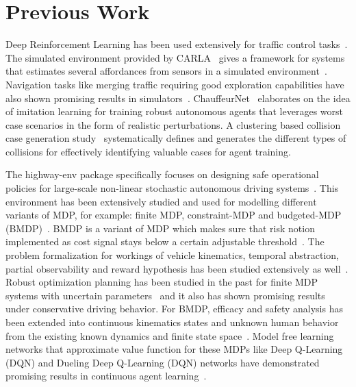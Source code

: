 \documentclass[a4, conference]{IEEEtran}
\begin{document}
\section{Previous Work}


    Deep Reinforcement Learning has been used extensively for traffic control tasks~\cite{belletti2017expert, wu2017emergent}. The simulated environment provided by CARLA~\cite{dosovitskiy2017carla} gives a framework for systems that estimates several affordances from sensors in a simulated environment~\cite{sauer2018conditional}. Navigation tasks like merging traffic requiring good exploration capabilities have also shown promising results in simulators~\cite{shalev2016safe}. ChauffeurNet~\cite{bansal2018chauffeurnet} elaborates on the idea of imitation learning for training robust autonomous agents that leverages worst case scenarios in the form of realistic perturbations. A clustering based collision case generation study~\cite{sun2021corner} systematically defines and generates the different types of collisions for effectively identifying valuable cases for agent training.

    The highway-env package specifically focuses on designing safe operational policies for large-scale non-linear stochastic autonomous driving systems~\cite{leurent2019approximate}. This environment has been extensively studied and used for modelling different variants of MDP, for example: finite MDP, constraint-MDP and budgeted-MDP (BMDP)~\cite{leurent2020safe}. BMDP is a variant of MDP which makes sure that risk notion implemented as cost signal stays below a certain adjustable threshold~\cite{carrara2019budgeted}. The problem formalization for workings of vehicle kinematics, temporal abstraction, partial observability and reward hypothesis has been studied extensively as well~\cite{leurent2020safe}. Robust optimization planning has been studied in the past for finite MDP systems with uncertain parameters~\cite{ernst2005tree, leurent2019interval, leurent2019practical} and it also has shown promising results under conservative driving behavior. For BMDP, efficacy and safety analysis has been extended into continuous kinematics states and unknown human behavior from the existing known dynamics and finite state space~\cite{carrara2019budgeted}. Model free learning networks that approximate value function for these MDPs like Deep Q-Learning (DQN) and Dueling Deep Q-Learning (DQN) networks have demonstrated promising results in continuous agent learning~\cite{gu2016continuous, wang2016dueling}.
\end{document}
